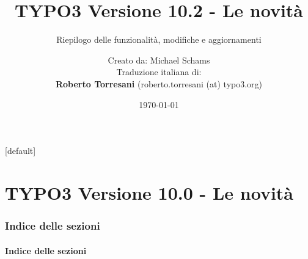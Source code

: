 \documentclass[t]{beamer}
\title{TYPO3 Versione 10.2 - Le novità}
\subtitle{Riepilogo delle funzionalità, modifiche e aggiornamenti}
\author{
	\centerline{Creato da: Michael Schams}
    \centerline{Traduzione italiana di:}
    \textbf{Roberto Torresani} (roberto.torresani (at) typo3.org)
}
\date{\today}
\begin{document}
\sharefont


\begingroup
	[default]
	\begin{frame}
		\titlepage
	\end{frame}
\endgroup


\section*{TYPO3 Versione 10.0 - Le novità}
\begin{frame}[fragile]
	\frametitle{Indice delle sezioni}
	\framesubtitle{Indice delle sezioni}

	\tableofcontents

\end{frame}











%

\end{document}
